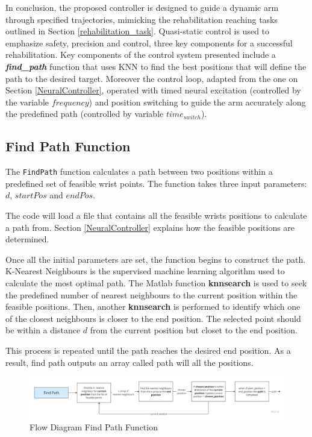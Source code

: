 In conclusion, the proposed controller is designed to guide a dynamic arm through specified trajectories, mimicking the rehabilitation reaching tasks outlined in Section \ref{rehabilitation_task}. Quasi-static control is used to emphasize safety, precision and control, three key components for a successful rehabilitation. Key components of the control system presented include a \textbf{\textit{find\_path} }function that uses KNN to find the best positions that will define the path to the desired target. Moreover the control loop, adapted from the one on Section \ref{NeuralController}, operated with timed neural excitation (controlled by the variable $frequency$) and position switching to guide the arm accurately along the predefined path (controlled by variable $time_{switch}$).




\subsection{Find Path Function} \label{findpath}

The \texttt{FindPath} function calculates a path between two positions within a predefined set of feasible wrist points. The function takes three input parameters: $d$,  $startPos$ and $endPos$. 

The code will load a file that contains all the feasible wrists positions to calculate a path from. Section \ref{NeuralController} explains how the feasible positions are determined. 

Once all the initial parameters are set, the function begins to construct the path. K-Nearest Neighbours is the supervised machine learning algorithm used to calculate the most optimal path. The Matlab function \textbf{knnsearch} is used to seek the predefined number of nearest neighbours to the current position within the feasible positions. Then, another \textbf{knnsearch} is performed to identify which one of the closest neighbours is closer to the end position. The selected point should be within a distance $d$ from the current position but closet to the end position.

This process is repeated until the path reaches the desired end position. As a result, find path outputs an array called path will all the positions.


\begin{figure}[h!]
    \centering
    \includegraphics[width=1\textwidth]{Pictures/Controller/findpath.jpg}
    \caption{Flow Diagram Find Path Function }
    \label{fig:FindPath}
\end{figure}



